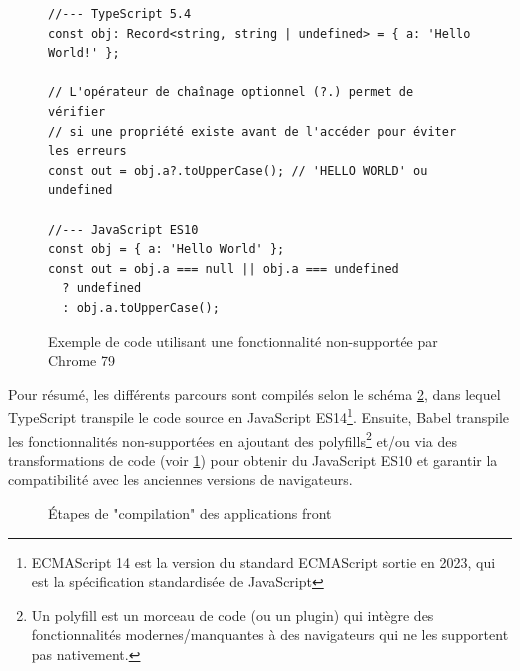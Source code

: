 \documentclass[12pt, a4paper]{report}
\begin{document}
	\begin{figure}[!h]
	\begin{verbatim}
//--- TypeScript 5.4
const obj: Record<string, string | undefined> = { a: 'Hello World!' };

// L'opérateur de chaînage optionnel (?.) permet de vérifier
// si une propriété existe avant de l'accéder pour éviter les erreurs
const out = obj.a?.toUpperCase(); // 'HELLO WORLD' ou undefined

//--- JavaScript ES10
const obj = { a: 'Hello World' };
const out = obj.a === null || obj.a === undefined 
  ? undefined 
  : obj.a.toUpperCase();
	\end{verbatim}
	\vspace{-.8cm}
	\caption{Exemple de code utilisant une fonctionnalité non-supportée par Chrome 79}
	\label{fig:optional_chaining}
	\end{figure}
	
	\newpage\noindent
	Pour résumé, les différents parcours sont compilés selon le schéma \ref{fig:compilation_front}, dans lequel TypeScript transpile le code source en JavaScript ES14\footnote{ECMAScript 14 est la version du standard ECMAScript sortie en 2023, qui est la spécification standardisée de JavaScript}. Ensuite, Babel transpile les fonctionnalités non-supportées en ajoutant des polyfills\footnote{Un polyfill est un morceau de code (ou un plugin) qui intègre des fonctionnalités modernes/manquantes à des navigateurs qui ne les supportent pas nativement.} et/ou via des transformations de code (voir \ref{fig:optional_chaining}) pour obtenir du JavaScript ES10 et garantir la compatibilité avec les anciennes versions de navigateurs.
	
	\begin{figure}[!h]
		\centering
		\vspace{-.3cm}
		\caption{Étapes de "compilation" des applications front}
		\label{fig:compilation_front}
	\end{figure}
	
\end{document}
